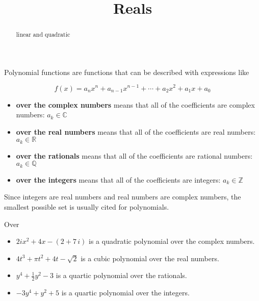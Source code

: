 \documentclass{ximera}
\title{Reals}
\begin{document}
\begin{abstract}
linear and quadratic
\end{abstract}
\maketitle




Polynomial functions are functions that can be described with expressions like

\[   f(x) = a_n x^n + a_{n-1} x^{n-1} + \cdots + a_2 x^2 + a_1 x + a_0     \]


\begin{itemize}
\item \textbf{over the complex numbers} means that all of the coefficients are complex numbers:   $a_k \in \mathbb{C}$
\item \textbf{over the real numbers} means that all of the coefficients are real numbers:   $a_k \in \mathbb{R}$
\item \textbf{over the rationals} means that all of the coefficients are rational numbers:   $a_k \in \mathbb{Q}$
\item \textbf{over the integers} means that all of the coefficients are integers:   $a_k \in \mathbb{Z}$
\end{itemize}



Since integers are real numbers and real numbers are complex numbers, the smallest possible set is usually cited for polynomials.



\begin{example}  Over


\begin{itemize}
\item $2i x^2 + 4 x - (2 + 7 \,i)$ is a quadratic polynomial over the complex numbers.

\item $4 t^3 + \pi t^2 + 4 t - \sqrt{2}$ is a cubic polynomial over the real numbers.

\item $ y^4 +  \frac{1}{2} y^2 - 3$ is a quartic polynomial over the rationals.

\item $-3 y^4 +  y^2 + 5$ is a quartic polynomial over the integers.
\end{itemize}




\end{example}
\end{document}
